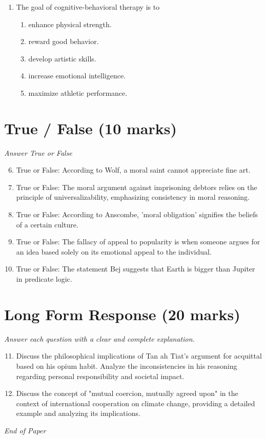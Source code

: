 \documentclass[12pt]{article}
\begin{document}
\begin{enumerate}[label=\arabic*.]
\begin{enumerate}[label=(\alph*)]
    \item Vishnu
    \item Shiva
\end{enumerate}
\item The goal of cognitive-behavioral therapy is to
\begin{enumerate}[label=(\alph*)]
    \item enhance physical strength.
    \item reward good behavior.
    \item develop artistic skills.
    \item increase emotional intelligence.
    \item maximize athletic performance.
\end{enumerate}
\end{enumerate}

\section*{True / False (10 marks)}
\textit{Answer True or False}
\begin{enumerate}[label=\arabic*.]
\setcounter{enumi}{5}
\item True or False: According to Wolf, a moral saint cannot appreciate fine art.
\item True or False: The moral argument against imprisoning debtors relies on the principle of universalizability, emphasizing consistency in moral reasoning.
\item True or False: According to Anscombe, 'moral obligation' signifies the beliefs of a certain culture.
\item True or False: The fallacy of appeal to popularity is when someone argues for an idea based solely on its emotional appeal to the individual.
\item True or False: The statement Bej suggests that Earth is bigger than Jupiter in predicate logic.
\end{enumerate}

\section*{Long Form Response (20 marks)}
\textit{Answer each question with a clear and complete explanation.}
\begin{enumerate}[label=\arabic*.]
\setcounter{enumi}{10}
\item Discuss the philosophical implications of Tan ah Tiat's argument for acquittal based on his opium habit. Analyze the inconsistencies in his reasoning regarding personal responsibility and societal impact.
\item Discuss the concept of "mutual coercion, mutually agreed upon" in the context of international cooperation on climate change, providing a detailed example and analyzing its implications.
\end{enumerate}

\vfill
\noindent\textit{End of Paper}
\end{document}
